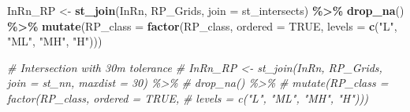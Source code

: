 \documentclass[
  12pt,
]{article}
\newenvironment{Shaded}{\begin{snugshade}}{\end{snugshade}}
\newcommand{\CommentTok}[1]{\textcolor[rgb]{0.56,0.35,0.01}{\textit{#1}}}
\newcommand{\DataTypeTok}[1]{\textcolor[rgb]{0.13,0.29,0.53}{#1}}
\newcommand{\KeywordTok}[1]{\textcolor[rgb]{0.13,0.29,0.53}{\textbf{#1}}}
\newcommand{\NormalTok}[1]{#1}
\newcommand{\OperatorTok}[1]{\textcolor[rgb]{0.81,0.36,0.00}{\textbf{#1}}}
\newcommand{\OtherTok}[1]{\textcolor[rgb]{0.56,0.35,0.01}{#1}}
\newcommand{\StringTok}[1]{\textcolor[rgb]{0.31,0.60,0.02}{#1}}
\begin{document}
\begin{Shaded}
\begin{Highlighting}[]
\NormalTok{  InRn\_RP \textless{}{-}}\StringTok{ }\KeywordTok{st\_join}\NormalTok{(InRn, RP\_Grids, }\DataTypeTok{join =}\NormalTok{ st\_intersects) }\OperatorTok{\%\textgreater{}\%}
\StringTok{    }\KeywordTok{drop\_na}\NormalTok{() }\OperatorTok{\%\textgreater{}\%}
\StringTok{    }\KeywordTok{mutate}\NormalTok{(}\DataTypeTok{RP\_class =} \KeywordTok{factor}\NormalTok{(RP\_class, }\DataTypeTok{ordered =} \OtherTok{TRUE}\NormalTok{, }
                             \DataTypeTok{levels =} \KeywordTok{c}\NormalTok{(}\StringTok{"L"}\NormalTok{, }\StringTok{"ML"}\NormalTok{, }\StringTok{"MH"}\NormalTok{, }\StringTok{"H"}\NormalTok{)))}

\CommentTok{\# Intersection with 30m tolerance}
  \CommentTok{\# InRn\_RP \textless{}{-} st\_join(InRn, RP\_Grids, join = st\_nn, maxdist = 30) \%\textgreater{}\%}
  \CommentTok{\#   drop\_na() \%\textgreater{}\%}
  \CommentTok{\#   mutate(RP\_class = factor(RP\_class, ordered = TRUE, }
  \CommentTok{\#                            levels = c("L", "ML", "MH", "H")))}
\end{Highlighting}
\end{Shaded}
\end{document}
